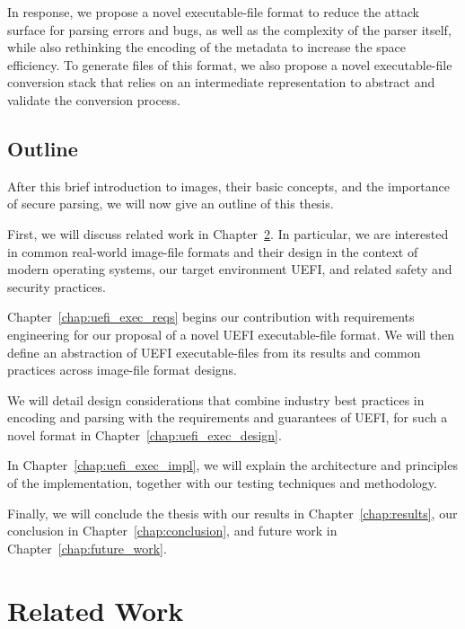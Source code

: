 In response, we propose a novel \gls{executable-file} format to reduce the attack surface for parsing errors and bugs, as well as the complexity of the parser itself, while also rethinking the encoding of the metadata to increase the space efficiency. To generate files of this format, we also propose a novel \gls{executable-file} conversion stack that relies on an intermediate representation to abstract and validate the conversion process.

\section{Outline}

After this brief introduction to \glspl{image}, their basic concepts, and the importance of secure parsing, we will now give an outline of this thesis.

First, we will discuss related work in Chapter~\ref{chap:related_work}. In particular, we are interested in common real-world \gls{image-file} formats and their design in the context of modern operating systems, our target environment \gls{UEFI}, and related safety and security practices.

Chapter~\ref{chap:uefi_exec_reqs} begins our contribution with requirements engineering for our proposal of a novel \gls{UEFI} \gls{executable-file} format. We will then define an abstraction of \gls{UEFI} \glspl{executable-file} from its results and common practices across \gls{image-file} format designs.

We will detail design considerations that combine industry best practices in encoding and parsing with the requirements and guarantees of \gls{UEFI}, for such a novel format in Chapter~\ref{chap:uefi_exec_design}.

In Chapter~\ref{chap:uefi_exec_impl}, we will explain the architecture and principles of the implementation, together with our testing techniques and methodology.

Finally, we will conclude the thesis with our results in Chapter~\ref{chap:results}, our conclusion in Chapter~\ref{chap:conclusion}, and future work in Chapter~\ref{chap:future_work}.

\chapter{Related Work} %
\label{chap:related_work}

